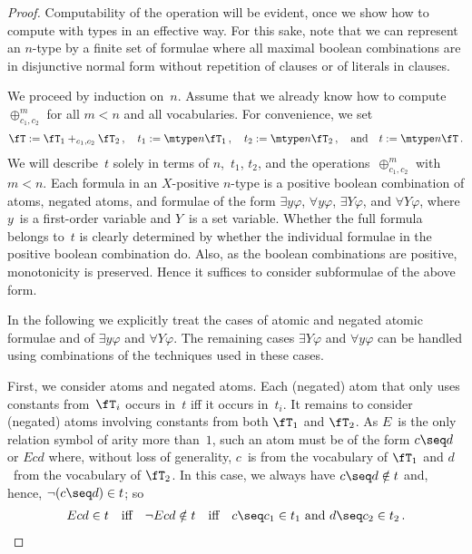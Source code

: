 \documentclass{LMCS}
\begin{document}
\begin{proof}
Computability of the operation will be evident,
once we show how to compute with types in an effective way.
For this sake,
note that we can represent an $n$-type by a finite
set of formulae where all maximal boolean combinations
are in disjunctive normal form without repetition of clauses
or of literals in clauses.

We proceed by induction on~$n$.
Assume that we already know how to compute~$\oplus^m_{c_1,c_2}$ for all $m<n$
and all vocabularies.
For convenience, we set
\begin{align*}
  \fT:=\fT_1 +_{c_1,c_2} \fT_2\,,\quad
  t_1:=\mtype n{\fT_1}\,,\quad
  t_2:=\mtype n{\fT_2}\,,
  \quad\text{and}\quad
  t:=\mtype n{\fT}\,.
\end{align*}
We will describe~$t$ solely in terms of $n$,~$t_1$, $t_2$,
and the operations~$\oplus^m_{c_1,c_2}$ with $m < n$.
Each formula in an $X$-positive $n$-type
is a positive boolean combination of atoms, negated atoms,
and formulae of the form $\exists y\varphi$, $\forall y\varphi$,
$\exists Y\varphi$, and $\forall Y\varphi$,
where $y$~is a first-order variable and $Y$~is a set variable.
Whether the full formula belongs to~$t$ is clearly determined
by whether the individual formulae in the positive boolean combination do.
Also, as the boolean combinations are positive,
monotonicity is preserved.
Hence it suffices to consider subformulae of the above form.

In the following we explicitly treat the cases of
atomic and negated atomic formulae and of
$\exists y\varphi$ and $\forall Y\varphi$.
The remaining cases $\exists Y\varphi$ and $\forall y\varphi$
can be handled using combinations of the techniques
used in these cases.

\smallskip
First, we consider atoms and negated atoms.
Each (negated) atom that only uses constants from~$\fT_i$
occurs in~$t$ iff it occurs in~$t_i$.
It remains to consider (negated) atoms
involving constants from both $\fT_1$ and $\fT_2$.
As $E$~is the only relation symbol of arity more than~$1$,
such an atom must be of the form $c\seq d$ or $Ecd$ where,
without loss of generality, $c$~is from the vocabulary of $\fT_1$
and $d$~from the vocabulary of $\fT_2$.
In this case, we always have $c\seq d \notin t$
and, hence, $\neg(c\seq d) \in t$\?;
so
\begin{align*}
  Ecd\in t \quad\text{iff}\quad \neg Ecd \notin t
  \quad\text{iff}\quad
  c\seq c_1\in t_1 \text{ and } d\seq c_2\in t_2\,.
\end{align*}


\end{proof}
\end{document}

